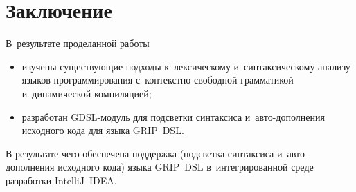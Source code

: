 \chapter*{Заключение}                       %


В~результате проделанной работы 

\begin{itemize} 
	\item{изучены существующие подходы к~лексическому и~синтаксическому анализу языков программирования с~контекстно-свободной грамматикой и~динамической компиляцией;}	
	\item{разработан GDSL-модуль для подсветки синтаксиса и~авто-дополнения исходного кода для языка GRIP~DSL.}
\end{itemize} 

В результате чего обеспечена поддержка (подсветка синтаксиса и~авто-дополнения исходного кода) языка GRIP~DSL в~интегрированной среде разработки IntelliJ~IDEA.
